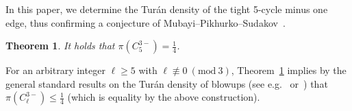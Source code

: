 \documentclass[11pt,a4paper]{article}
\newcommand{\Mod}[1]{\ (\mathrm{mod}\ #1)}
\newtheorem{theorem}[definition]{Theorem}
\theoremstyle{remark}
\begin{document}
In this paper, we determine the Tur\'an density of the tight 5-cycle minus one edge, thus confirming a conjecture of Mubayi--Pikhurko--Sudakov~{\cite[Conjecture~8]{MPS11}}. 
%
\begin{theorem}\label{THM:turan-density-C5-} 
    It holds that $\pi(C_{5}^{3-}) = \frac{1}{4}$.
\end{theorem}

%



For an arbitrary integer $\ell\ge 5$ with $\ell \not\equiv 0 \Mod{3}$, Theorem~\ref{THM:turan-density-C5-} implies by the general standard results on the Tur\'an density of blowups (see e.g.~{\cite[Theorem~2.2]{Kee11}} or~{\cite[Claim~5.14]{BL24C5Minus}}) that 
$\pi(C_{\ell}^{3-}) \le  \frac{1}{4}$ (which is equality by the above construction).

\end{document}
